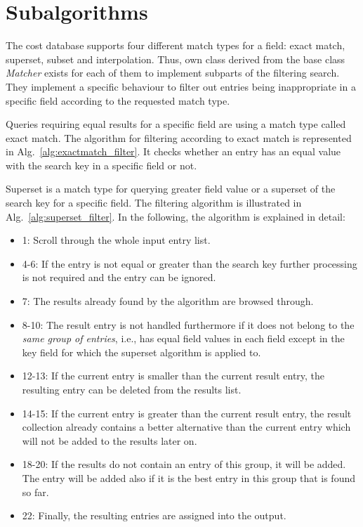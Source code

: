 \documentclass[a4paper,twoside]{tce}
\begin{document}
\section{Subalgorithms}

The cost database supports four different match types for a field:
exact match, superset, subset and interpolation. Thus, own class
derived from the base class \emph{Matcher} exists for each of them to
implement subparts of the filtering search. They implement a specific
behaviour to filter out entries being inappropriate in a specific
field according to the requested match type.

Queries requiring equal results for a specific field are using a
match type called exact match. The algorithm for filtering according
to exact match is represented in Alg.~\ref{alg:exactmatch_filter}. It
checks whether an entry has an equal value with the search key in a
specific field or not.

Superset is a match type for querying greater field value or a
superset of the search key for a specific field. The filtering
algorithm is illustrated in Alg.~\ref{alg:superset_filter}. In
the following, the algorithm is explained in detail:
\begin{itemize}
\item 1: Scroll through the whole input entry list.
\item 4-6: If the entry is not equal or greater than the search key
      further processing is not required and the entry can be ignored.
\item 7: The results already found by the algorithm are browsed through.
\item 8-10: The result entry is not handled furthermore if it does not
      belong to the \emph{same group of entries}, i.e., has equal field
      values in each field except in the key field for which
      the superset algorithm is applied to.
\item 12-13: If the current entry is smaller than the current result
      entry, the resulting entry can be deleted from the results list.
\item 14-15: If the current entry is greater than the current result
      entry, the result collection already contains a better
      alternative than the current entry which will not be added to
      the results later on.
\item 18-20: If the results do not contain an entry of this group,
      it will be added. The entry will be added also if it is the best
      entry in this group that is found so far.
\item 22: Finally, the resulting entries are assigned into the output.
\end{itemize}
\end{document}
